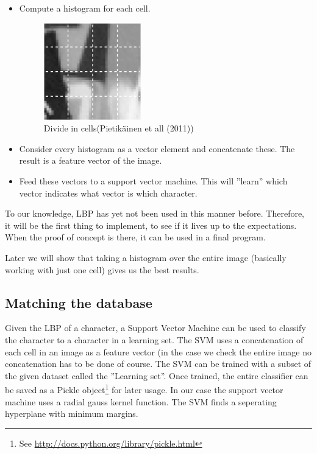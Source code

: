 \documentclass[a4paper]{article}
\begin{document}
\begin{itemize}
\item Compute a histogram for each cell.

\begin{figure}[H]
\center
\includegraphics[scale=0.7]{cells.png}
\caption{Divide in cells(Pietik\"ainen et all (2011))}
\end{figure}

\item Consider every histogram as a vector element and concatenate these. The
result is a feature vector of the image.

\item Feed these vectors to a support vector machine. This will ''learn'' which
vector indicates what vector is which character.

\end{itemize}

To our knowledge, LBP has yet not been used in this manner before. Therefore,
it will be the first thing to implement, to see if it lives up to the
expectations. When the proof of concept is there, it can be used in a final
program.

Later we will show that taking a histogram over the entire image (basically
working with just one cell) gives us the best results.

\subsection{Matching the database}

Given the LBP of a character, a Support Vector Machine can be used to classify
the character to a character in a learning set. The SVM uses a concatenation
of each cell in an image as a feature vector (in the case we check the entire
image no concatenation has to be done of course. The SVM can be trained with a
subset of the given dataset called the ''Learning set''. Once trained, the
entire classifier can be saved as a Pickle object\footnote{See
\url{http://docs.python.org/library/pickle.html}} for later usage.
In our case the support vector machine uses a radial gauss kernel function. The
 SVM finds a seperating hyperplane with minimum margins.
\end{document}
